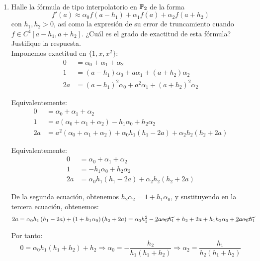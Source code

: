 \begin{ejercicio}\label{ej:2.1.7}~
    \begin{enumerate}
        \item Halle la fórmula de tipo interpolatorio en $\mathbb{P}_2$ de la forma
        \[
        f'(a) \approx \alpha_0 f(a - h_1) + \alpha_1 f(a) + \alpha_2 f(a + h_2)
        \]
        con $h_1, h_2 > 0$, así como la expresión de su error de truncamiento cuando $f \in C^4[a - h_1, a + h_2]$. ¿Cuál es el grado de exactitud de esta fórmula? Justifique la respuesta.\\

        Imponemos exactitud en $\{1, x, x^2\}$:
        \begin{align*}
            0 &= \alpha_0 + \alpha_1 + \alpha_2\\
            1 &= (a-h_1)\alpha_0 + a\alpha_1 + (a+h_2)\alpha_2\\
            2a &= (a-h_1)^2\alpha_0 + a^2\alpha_1 + (a+h_2)^2\alpha_2
        \end{align*}

        Equivalentemente:
        \begin{align*}
            0 &= \alpha_0 + \alpha_1 + \alpha_2\\
            1 &= a\left(\alpha_0 + \alpha_1 + \alpha_2\right) - h_1\alpha_0 + h_2\alpha_2\\
            2a &= a^2\left(\alpha_0 + \alpha_1 + \alpha_2\right) + \alpha_0h_1\left(h_1-2a\right) + \alpha_2h_2\left(h_2+2a\right)
        \end{align*}

        Equivalentemente:
        \begin{align*}
            0 &= \alpha_0 + \alpha_1 + \alpha_2\\
            1 &= - h_1\alpha_0 + h_2\alpha_2\\
            2a &= \alpha_0h_1\left(h_1-2a\right) + \alpha_2h_2\left(h_2+2a\right)
        \end{align*}

        De la segunda ecuación, obtenemos $h_2\alpha_2=1+h_1\alpha_0$, y sustituyendo en la tercera ecuación, obtenemos:
        \begin{align*}
            2a &= \alpha_0h_1\left(h_1-2a\right) + \left(1+h_1\alpha_0\right)\left(h_2+2a\right)
            = \alpha_0h_1^2-\cancel{2a\alpha_0h_1} + h_2 + 2a + h_1h_2\alpha_0 + \cancel{2a\alpha_0h_1}
        \end{align*}

        Por tanto:
        \begin{equation*}
            0=\alpha_0h_1\left(h_1+h_2\right) + h_2
            \Longrightarrow
            \alpha_0 = -\dfrac{h_2}{h_1\left(h_1+h_2\right)}
            \Longrightarrow
            \alpha_2 = \dfrac{h_1}{h_2\left(h_1+h_2\right)}
        \end{equation*}


\end{enumerate}
\end{ejercicio}
